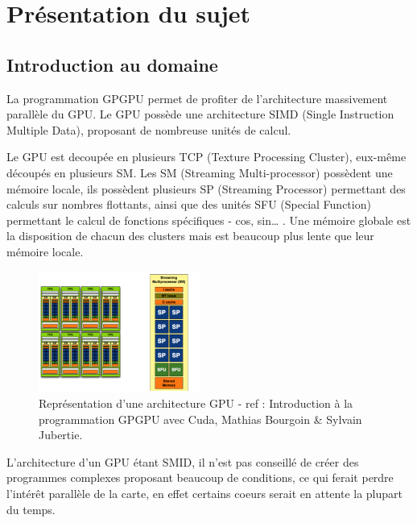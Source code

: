 \documentclass{report}
\begin{document}
\chapter{Présentation du sujet}

\section{Introduction au domaine}
La programmation GPGPU permet de profiter de l’architecture massivement parallèle du GPU. Le GPU possède une architecture SIMD (Single Instruction Multiple Data), proposant de nombreuse unités de calcul.\newline

Le GPU est decoupée en plusieurs TCP (Texture Processing Cluster), eux-même découpés en plusieurs SM. Les SM (Streaming Multi-processor) possèdent une mémoire locale, ils possèdent plusieurs SP (Streaming Processor) permettant des calculs sur nombres flottants, ainsi que des unités SFU (Special Function) permettant le calcul de fonctions spécifiques - cos, sin… . Une mémoire globale est la disposition de chacun des clusters mais est beaucoup plus lente que leur mémoire locale.\newline

\begin{figure}
\begin{center}
\includegraphics[height=150]{image2.png}
\end{center}
\caption{Représentation d’une architecture GPU - ref : Introduction à la programmation GPGPU avec Cuda, Mathias Bourgoin & Sylvain Jubertie.}
\label{test}
\end{figure}

L’architecture d’un GPU étant SMID, il n’est pas conseillé de créer des programmes complexes proposant beaucoup de conditions, ce qui ferait perdre l'intérêt parallèle de la carte, en effet certains coeurs serait en attente la plupart du temps. 
\end{document}
